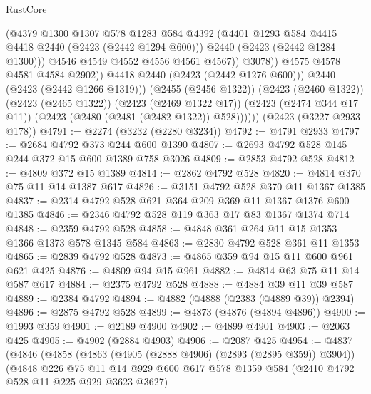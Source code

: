 \begin{lexlean}{RustCore}
\begin{coremodule}
                            (@4379
                              @1300
                              @1307
                              @578
                              @1283
                              @584
                              @4392
                              (@4401 @1293 @584 @4415 @4418 @2440 (@2423 (@2442 @1294 @600)))
                              @2440
                              (@2423 (@2442 @1284 @1300)))
                            @4546
                            @4549
                            @4552
                            @4556
                            @4561
                            @4567))
                        @3078))
                    @4575
                    @4578
                    @4581
                    @4584
                    @2902))
                @4418
                @2440
                (@2423 (@2442 @1276 @600)))
              @2440
              (@2423 (@2442 @1266 @1319)))
            (@2455 (@2456 @1322))
            (@2423 (@2460 @1322))
            (@2423 (@2465 @1322))
            (@2423 (@2469 @1322 @17))
            (@2423 (@2474 @344 @17 @11))
            (@2423 (@2480 (@2481 (@2482 @1322)) @528))))))
    (@2423 (@3227 @2933 @178))
@4791 := @2274 (@3232 (@2280 @3234))
@4792 := @4791 @2933
@4797 := @2684 @4792 @373 @244 @600 @1390
@4807 := @2693 @4792 @528 @145 @244 @372 @15 @600 @1389 @758 @3026
@4809 := @2853 @4792 @528
@4812 := @4809 @372 @15 @1389
@4814 := @2862 @4792 @528
@4820 := @4814 @370 @75 @11 @14 @1387 @617
@4826 := @3151 @4792 @528 @370 @11 @1367 @1385
@4837 := @2314 @4792 @528 @621 @364 @209 @369 @11 @1367 @1376 @600 @1385
@4846 := @2346 @4792 @528 @119 @363 @17 @83 @1367 @1374 @714
@4848 := @2359 @4792 @528
@4858 := @4848 @361 @264 @11 @15 @1353 @1366 @1373 @578 @1345 @584
@4863 := @2830 @4792 @528 @361 @11 @1353
@4865 := @2839 @4792 @528
@4873 := @4865 @359 @94 @15 @11 @600 @961 @621 @425
@4876 := @4809 @94 @15 @961
@4882 := @4814 @63 @75 @11 @14 @587 @617
@4884 := @2375 @4792 @528
@4888 := @4884 @39 @11 @39 @587
@4889 := @2384 @4792
@4894 := @4882 (@4888 (@2383 (@4889 @39)) @2394)
@4896 := @2875 @4792 @528
@4899 := @4873 (@4876 (@4894 @4896))
@4900 := @1993 @359
@4901 := @2189 @4900
@4902 := @4899 @4901
@4903 := @2063 @425
@4905 := @4902 (@2884 @4903)
@4906 := @2087 @425
@4954 := @4837
    (@4846
      (@4858
        (@4863 (@4905 (@2888 @4906) (@2893 (@2895 @359)) @3904))
        (@4848
          @226
          @75
          @11
          @14
          @929
          @600
          @617
          @578
          @1359
          @584
          (@2410 @4792 @528 @11 @225 @929 @3623 @3627)

\end{coremodule}
\end{lexlean}
